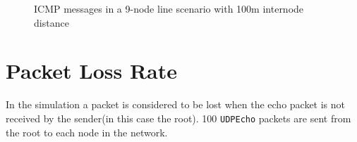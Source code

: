 \begin{figure}[htbp]
  \begin{center}
  	\hspace{-20pt}
    \leavevmode
      \hspace{-30pt}
    \caption{ICMP messages in a 9-node line scenario with 100m internode distance}
    \label{fig:9_MRHOF_line_100_icmp}
  \end{center}
\end{figure}

\section{Packet Loss Rate}
\label{pl}

In the simulation a packet is considered to be lost when the echo packet is not received by the sender(in this case the root). 100 \texttt{UDPEcho} packets are sent from the root to each node in the network.


